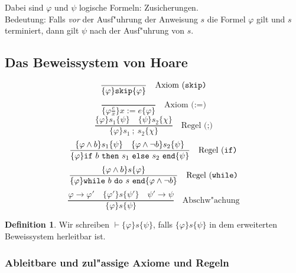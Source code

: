 \documentclass[german,10pt, a4paper, twocolumn]{scrartcl}
\theoremstyle{definition}
\newtheorem{definition}{Definition}[section]
\theoremstyle{remark}
\begin{document}
Dabei sind $\varphi$ und $\psi$ logische Formeln: Zusicherungen.\\

Bedeutung: Falls \textit{vor} der Ausf"uhrung der Anweisung $s$ die Formel $\varphi$ gilt und $s$ terminiert, dann gilt $\psi$ nach der Ausf"uhrung von $s$.

\subsection{Das Beweissystem von Hoare}

\begin{displaymath}
	\frac{}{\{\varphi\}\mbox{\tt skip}\{\varphi\}} \quad \mbox{Axiom (\tt{skip})}
\end{displaymath}
\begin{displaymath}
	\frac{}{\{\varphi\frac{e}{x}\}x := e\{\varphi\}} \quad \mbox{Axiom (:=)}
\end{displaymath}
\begin{displaymath}
	\frac{\{\varphi\}s_1\{\psi\}\quad \{\psi\}s_2\{\chi\} }{\{\varphi\}s_1\ ;\ s_2\{\chi\}} \quad \mbox{Regel (;)}
\end{displaymath}
\begin{displaymath}
	\frac{\{\varphi\land b\}s_1\{\psi\}\quad \{\varphi \land \lnot b\}s_2\{\psi\} }{\{\varphi\} \mbox{\tt if}\ b\ \mbox{\tt then}\ s_1\ \mbox{\tt else}\ s_2\ \mbox{\tt end}  \{\psi\}} \quad \mbox{Regel (\tt{if})}
\end{displaymath}
\begin{displaymath}
	\frac{\{ \varphi \land b \} s \{ \varphi \} }{\{\varphi\} \mbox{\tt while}\ b\ \mbox{\tt do}\ s \ \mbox{\tt end}   \{\varphi \land \lnot b\} } \quad  \mbox{Regel (\tt{while})}
\end{displaymath}
\begin{displaymath}
	\frac{\varphi \rightarrow \varphi' \quad \{\varphi'\}s\{\psi'\} \quad \psi' \rightarrow \psi }{ \{\varphi\} s \{ \psi\}} \quad  \mbox{Abschw"achung}
\end{displaymath}

\begin{definition}
	Wir schreiben $\vdash \{\varphi\} s \{\psi\}$, falls $\{\varphi\} s \{ \psi\}$ in dem erweiterten Beweissystem herleitbar ist.
\end{definition}

\subsubsection{Ableitbare und zul"assige Axiome und Regeln}
\end{document}
